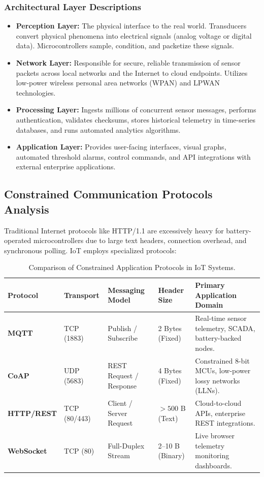 \documentclass[11pt,a4paper]{article}
\begin{document}
\subsubsection{Architectural Layer Descriptions}
\begin{itemize}[leftmargin=*]
    \item \textbf{Perception Layer:} The physical interface to the real world. Transducers convert physical phenomena into electrical signals (analog voltage or digital data). Microcontrollers sample, condition, and packetize these signals.
    \item \textbf{Network Layer:} Responsible for secure, reliable transmission of sensor packets across local networks and the Internet to cloud endpoints. Utilizes low-power wireless personal area networks (WPAN) and LPWAN technologies.
    \item \textbf{Processing Layer:} Ingests millions of concurrent sensor messages, performs authentication, validates checksums, stores historical telemetry in time-series databases, and runs automated analytics algorithms.
    \item \textbf{Application Layer:} Provides user-facing interfaces, visual graphs, automated threshold alarms, control commands, and API integrations with external enterprise applications.
\end{itemize}

\subsection{Constrained Communication Protocols Analysis}
Traditional Internet protocols like HTTP/1.1 are excessively heavy for battery-operated microcontrollers due to large text headers, connection overhead, and synchronous polling. IoT employs specialized protocols:

\begin{table}[H]
\centering
\small
\renewcommand{\arraystretch}{1.3}
\begin{tabularx}{\textwidth}{|p{2.1cm}|p{2.0cm}|p{3.1cm}|p{2.0cm}|X|}
\hline
\textbf{Protocol} & \textbf{Transport} & \textbf{Messaging Model} & \textbf{Header Size} & \textbf{Primary Application Domain} \\
\hline
\textbf{MQTT} & TCP (1883) & Publish / Subscribe & 2 Bytes (Fixed) & Real-time sensor telemetry, SCADA, battery-backed nodes. \\
\textbf{CoAP} & UDP (5683) & REST Request / Response & 4 Bytes (Fixed) & Constrained 8-bit MCUs, low-power lossy networks (LLNs). \\
\textbf{HTTP/REST} & TCP (80/443) & Client / Server Request & $>500$ B (Text) & Cloud-to-cloud APIs, enterprise REST integrations. \\
\textbf{WebSocket} & TCP (80) & Full-Duplex Stream & 2--10 B (Binary) & Live browser telemetry monitoring dashboards. \\
\hline
\end{tabularx}
\caption{Comparison of Constrained Application Protocols in IoT Systems.}
\label{tab:protocols}
\end{table}
\end{document}

